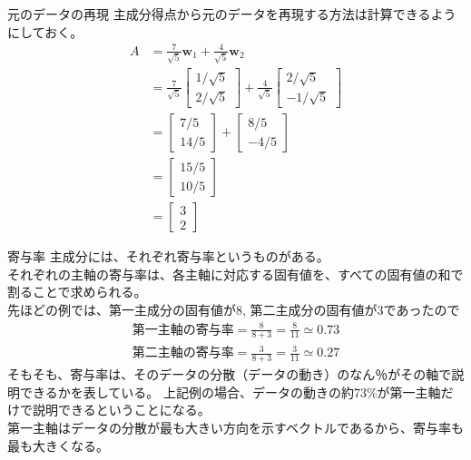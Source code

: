 \documentclass[dvipdfmx,autodetect-engine, unicode, 10pt, aspectratio=169]{beamer}
\begin{document}
\begin{frame}{元のデータの再現}
    主成分得点から元のデータを再現する方法は計算できるようにしておく。
    \begin{align*}
        A &= \frac{7}{\sqrt{5}}\bm{w}_1 + \frac{4}{\sqrt{5}}\bm{w}_2 \\
          &= \frac{7}{\sqrt{5}}\begin{bmatrix}
              1/\sqrt{5} \\
              2/\sqrt{5}
          \end{bmatrix} +
          \frac{4}{\sqrt{5}}  \begin{bmatrix}
              2/\sqrt{5} \\
              -1/\sqrt{5}
          \end{bmatrix}\\
          &= \begin{bmatrix}
              7/5 \\
              14/5
          \end{bmatrix} +
          \begin{bmatrix}
              8/5 \\
              -4/5
          \end{bmatrix}  \\
          &= \begin{bmatrix}
              15/5 \\
              10/5
          \end{bmatrix} \\
          &= \begin{bmatrix}
              3 \\
              2
          \end{bmatrix}
    \end{align*}
\end{frame}

\begin{frame}{寄与率}
    主成分には、それぞれ寄与率というものがある。\\
    それぞれの主軸の寄与率は、各主軸に対応する固有値を、すべての固有値の和で割ることで求められる。 \\
    先ほどの例では、第一主成分の固有値が8, 第二主成分の固有値が3であったので
    \begin{align*}
        \text{第一主軸の寄与率}=\frac{8}{8+3} = \frac{8}{11}\simeq 0.73 \\
        \text{第二主軸の寄与率}=\frac{3}{8+3} = \frac{3}{11} \simeq 0.27
    \end{align*}
    そもそも、寄与率は、そのデータの分散（データの動き）のなん％がその軸で説明できるかを表している。
    上記例の場合、データの動きの約73\%が第一主軸だけで説明できるということになる。\\
    第一主軸はデータの分散が最も大きい方向を示すベクトルであるから、寄与率も最も大きくなる。
\end{frame}
\end{document}
